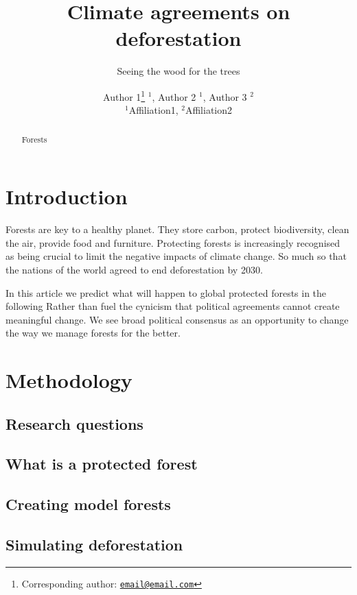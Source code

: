 \documentclass[
]{article}
\title{Climate agreements on deforestation}
\subtitle{Seeing the wood for the trees}
\author{Author 1\footnote{Corresponding author: \href{mailto:email@email.com}{\nolinkurl{email@email.com}}} \(^1\), Author 2 \(^1\), Author 3 \(^2\)\\
\(^1\)Affiliation1, \(^2\)Affiliation2}
\date{}
\begin{document}
\maketitle
\begin{abstract}
Forests
\end{abstract}

{
\setcounter{tocdepth}{2}
\tableofcontents
}
\hypertarget{introduction}{%
\section{Introduction}\label{introduction}}

Forests are key to a healthy planet.
They store carbon, protect biodiversity, clean the air, provide food and furniture.
Protecting forests is increasingly recognised as being crucial to limit the negative impacts of climate change.
So much so that the nations of the world agreed to end deforestation by 2030.

In this article we predict what will happen to global protected forests in the following
Rather than fuel the cynicism that political agreements cannot create meaningful change.
We see broad political consensus as an opportunity to change the way we manage forests for the better.

\hypertarget{methodology}{%
\section{Methodology}\label{methodology}}

\hypertarget{research-questions}{%
\subsection{Research questions}\label{research-questions}}

\hypertarget{what-is-a-protected-forest}{%
\subsection{What is a protected forest}\label{what-is-a-protected-forest}}

\hypertarget{creating-model-forests}{%
\subsection{Creating model forests}\label{creating-model-forests}}

\hypertarget{simulating-deforestation}{%
\subsection{Simulating deforestation}\label{simulating-deforestation}}
\end{document}
